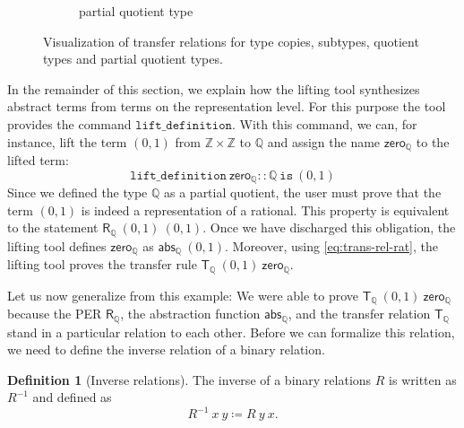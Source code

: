 \documentclass{article}
\theoremstyle{definition}
\newtheorem{definition}{Definition}[section]
\newcommand{\inv}{^{-1}}
\newcommand{\inte}{\mathbb{Z}}
\newcommand{\rat}{\mathbb{Q}}
\newcommand{\abs}{\mathsf{abs}}
\begin{document}
\begin{figure}[h]
\begin{subfigure}[b]{0.4\textwidth}
		\caption{partial quotient type}
		\label{fig:trans-rels-par-quot}
	\end{subfigure}
	\caption{Visualization of transfer relations for type copies, subtypes, quotient types and partial quotient types.}
	\label{fig:lift-tool-trans-rels}
\end{figure}

In the remainder of this section,
we explain how the lifting tool synthesizes abstract terms from terms on the representation level.
For this purpose the tool provides the command \(\mathtt{lift\_definition}\).
With this command, we can, for instance, lift the term
\((0, 1)\) from \(\inte \times \inte\) to \(\rat\) and assign the name \(\mathsf{zero_\rat}\) to the lifted term:
\begin{equation*}
	\mathtt{lift\_definition}\ \mathsf{zero_\rat} :: \rat\ \mathtt{is}\ (0, 1)
\end{equation*}
Since we defined the type \(\rat\) as a partial quotient, the user must prove that the term \((0, 1)\) is indeed a representation of a rational.
This property is equivalent to the statement \(\mathsf{R_\rat}\ (0, 1)\ (0, 1)\).
Once we have discharged this obligation, the lifting tool defines \(\mathsf{zero_\rat}\) as \(\abs_\rat\ (0, 1)\).
Moreover, using \cref{eq:trans-rel-rat}, the lifting tool
proves the transfer rule \(\mathsf{T_\rat}\ (0, 1)\ \mathsf{zero_\rat}\).

Let us now generalize from this example:
We were able to prove \(\mathsf{T_\rat}\ (0, 1)\ \mathsf{zero_\rat}\) because the PER \(\mathsf{R_\rat}\),
the abstraction function \(\abs_\rat\),
and the transfer relation \(\mathsf{T_\rat}\)
stand in a particular relation to each other.
Before we can formalize this relation,
we need to define the inverse relation of a binary relation.
\begin{definition}[Inverse relations]
	The inverse of a binary relations \(R\) is written as \(R\inv\) and defined as
	\begin{equation}
		R\inv\ x\ y \coloneqq R\ y\ x.
	\end{equation}
\end{definition}
\end{document}
